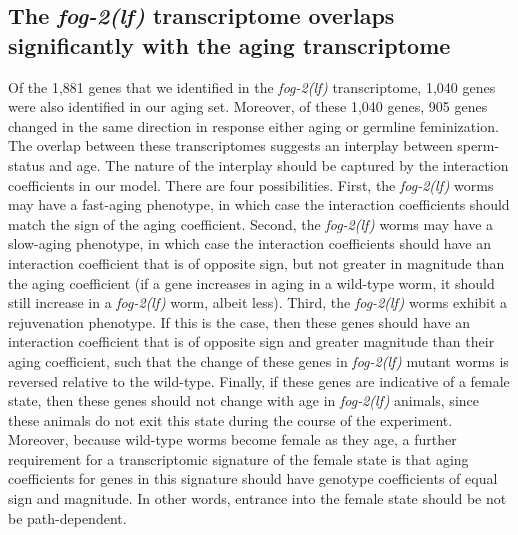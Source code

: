 \documentclass[9pt,twocolumn,twoside]{gsajnl}
\newcommand{\fog}{\emph{\mbox{fog-2(lf)}}}
\newcommand{\fogn}{1,881}
\newcommand{\coexpressed}{905}
\newcommand{\intersectn}{1,040}
\begin{document}
\subsection{The \fog{} transcriptome overlaps significantly with the aging
transcriptome}
Of the \fogn{} genes that we identified in the \fog{}
transcriptome, \intersectn{} genes were also identified in our aging set.
Moreover, of these \intersectn{}  genes, \coexpressed{} genes changed in the
same direction in response either aging or germline feminization.
The overlap between these transcriptomes suggests an interplay between sperm-status
and age. The nature of the interplay should be captured by the interaction coefficients
in our model.
There are four possibilities. First, the \fog{} worms may
have a fast-aging phenotype, in which case the interaction coefficients should
match the sign of the aging coefficient.
Second, the \fog{} worms may
have a slow-aging phenotype, in which case the interaction coefficients should
have an interaction coefficient that is of opposite sign, but not greater in
magnitude than the aging coefficient (if a gene increases in aging in a
wild-type worm, it should still increase in a \fog{} worm, albeit less).
Third, the \fog{} worms exhibit a rejuvenation phenotype. If this is the case,
then these genes should have an interaction coefficient that is of opposite sign
and greater magnitude than their aging coefficient, such that the change of
these genes in \fog{} mutant worms is reversed relative to the wild-type.
Finally, if these genes are indicative of a female state, then these genes
should not change with age in \fog{} animals, since these animals do not exit
this state during the course of the experiment.
Moreover, because wild-type
worms become female as they age, a further requirement for a transcriptomic
signature of the female state is that aging coefficients for genes in this
signature should have genotype coefficients of equal sign and magnitude. In
other words, entrance into the female state should be not be path-dependent.
\end{document}
